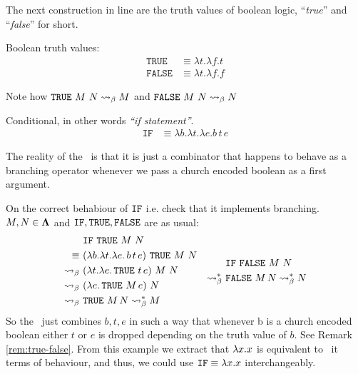 \documentclass[12pt]{book}
\begin{document}
The next construction in line are the truth values of boolean logic, ``\textit{true}'' and ``\textit{false}'' for short.
\begin{definition} Boolean truth values:
  \begin{align*}
    \texttt{TRUE} &\equiv \lambda t.\lambda f. t \\
    \texttt{FALSE} &\equiv \lambda t.\lambda f. f
  \end{align*}
\end{definition}
\begin{remark}
  \label{rem:true-false}
  Note how $\texttt{TRUE} \ M \ N \mathrel{\leadsto}_\beta M $ and $ \texttt{FALSE} \ M \ N \mathrel{\leadsto}_\beta N $
\end{remark}
\begin{definition} Conditional, in other words \textit{``if statement''}.
  \begin{align*}
    \texttt{IF} &\equiv \lambda b.\lambda t.\lambda e. b\,t\,e
  \end{align*}
\end{definition}
The reality of the \IF \ is that it is just a combinator that happens to behave as a branching operator whenever we pass a church encoded boolean as a first argument.
\begin{example} On the correct behabiour of $\texttt{IF}$ i.e. check that it implements branching. $ M, N \in \mathbf{\Lambda} $ and $ \texttt{IF}, \texttt{TRUE}, \texttt{FALSE}$ are as usual:
  \[
    \begin{aligned}
      & \IF \ \TRUE \ M \ N \\
      \equiv \ & (\la b.\la t.\la e.\, b\, t\, e) \ \TRUE \ M \ N  \\
      \curly \ & (\la t.\la e.\, \TRUE\ t\, e) \ M \ N  \\
      \curly \ & (\la e.\, \TRUE\ M\, e) \ N  \\
      \curly \ & \TRUE\ M\, N \curly^* M 
    \end{aligned}
    \quad
    \begin{aligned}
      & \IF \ \FALSE \ M \ N \\
      \curly^* \ & \FALSE\ M\, N \curly^* N
    \end{aligned}
  \]
  So the \IF \ just combines $b, t, e$ in such a way that whenever b is a church encoded boolean either $t$ or $e$ is dropped depending on the truth value of $b$. See Remark \ref{rem:true-false}. From this example we extract that $ \lambda x . x $ is equivalent to \IF \ it terms of behaviour, and thus, we could use $ \texttt{IF} \equiv \lambda x . x $ interchangeably.
\end{example}
\end{document}
